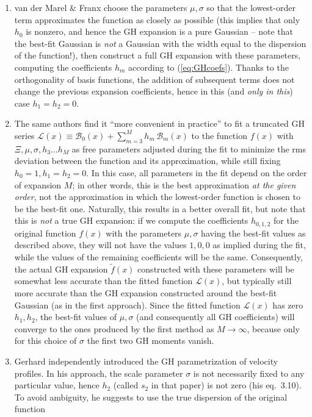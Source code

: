 \documentclass[12pt]{article}
\begin{document}
\begin{enumerate}
\item van der Marel \& Franx \cite{vdMarelFranx1993} choose the parameters $\mu, \sigma$ so that the lowest-order term approximates the function as closely as possible (this implies that only $h_0$ is nonzero, and hence the GH expansion is a pure Gaussian -- note that the best-fit Gaussian is \textit{not} a Gaussian with the width equal to the dispersion of the function!), then construct a full GH expansion with these parameters, computing the coefficients $h_m$ according to (\ref{eq:GHcoefs}). Thanks to the orthogonality of basis functions, the addition of subsequent terms does not change the previous expansion coefficients, hence in this (and \textit{only in this}) case $h_1=h_2=0$.
\item The same authors find it ``more convenient in practice'' to fit a truncated GH series $\mathscr L(x) \equiv \mathcal B_0(x) + \sum_{m=3}^M h_m\,\mathcal B_m(x)$ to the function $f(x)$ with $\Xi, \mu, \sigma, h_3 \dots h_M$ as free parameters adjusted during the fit to minimize the rms deviation between the function and its approximation, while still fixing $h_0=1, h_1=h_2=0$.
In this case, all parameters in the fit depend on the order of expansion $M$; in other words, this is the best approximation \textit{at the given order}, not the approximation in which the lowest-order function is chosen to be the best-fit one. Naturally, this results in a better overall fit, but note that this is \textit{not} a true GH expansion: if we compute the coefficients $h_{0,1,2}$ for the original function $f(x)$ with the parameters $\mu,\sigma$ having the best-fit values as described above, they will not have the values $1,0,0$ as implied during the fit, while the values of the remaining coefficients will be the same. Consequently, the actual GH expansion $\tilde f(x)$ constructed with these parameters will be somewhat less accurate than the fitted function $\mathscr L(x)$, but typically still more accurate than the GH expansion constructed around the best-fit Gaussian (as in the first approach). 
Since the fitted function $\mathscr L(x)$ has zero $h_1,h_2$, the best-fit values of $\mu,\sigma$ (and consequently all GH coefficients) will converge to the ones produced by the first method as $M \to \infty$, because only for this choice of $\sigma$ the first two GH moments vanish.
\item Gerhard \cite{Gerhard1993} independently introduced the GH parametrization of velocity profiles. In his approach, the scale parameter $\sigma$ is not necessarily fixed to any particular value, hence $h_2$ (called $s_2$ in that paper) is not zero (his eq.~3.10). To avoid ambiguity, he suggests to use the true dispersion of the original function%

\end{enumerate}
\end{document}
